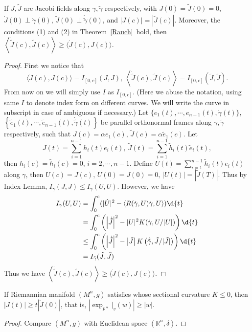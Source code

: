 \begin{lem}\label{compare jacobi fields}
    If $J,\tilde{J}$ are Jacobi fields along $\gamma,\tilde{\gamma}$ respectively, with $J(0)=\tilde{J}(0)=0$, $\dot{J}(0)\perp\dot{\gamma}(0)$, $\dot{\tilde{J}}(0)\perp\dot{\tilde{\gamma}}(0)$, and $|J(c)|=|\tilde{J}(c)|$.
    Moreover, the conditions (1) and (2) in Theorem~\ref{Rauch}~hold, then $\left\langle\dot{\tilde{J}}(c),\tilde{J}(c)\right\rangle\geq\langle\dot{J}(c),J(c)\rangle$.
\end{lem}
\begin{proof}
    First we notice that
    \[\langle\dot{J}(c),J(c)\rangle=I_{[0,c]}(J,J),\ \left\langle\dot{\tilde{J}}(c),\tilde{J}(c)\right\rangle=I_{[0,c]}\left(\tilde{J},\tilde{J}\right).\]
    From now on we will simply use $I$ as $I_{[0,c]}$.
    (Here we abuse the notation, using same $I$ to denote index form on different curves.
    We will write the curve in subscript in case of ambiguous if necessary.)
    Let $\{e_1(t),\cdots,e_{n-1}(t),\dot{\gamma}(t)\}$, $\left\{\tilde{e}_1(t),\cdots,\tilde{e}_{n-1}(t),\dot{\tilde{\gamma}}(t)\right\}$ be parallel orthonormal frames along $\gamma,\tilde{\gamma}$ respectively, such that $J(c)=\alpha e_1(c)$, $\tilde{J}(c)=\alpha\tilde{e}_1(c)$.
    Let
    \[J(t)=\sum_{i=1}^{n-1}h_i(t)e_i(t),\ \tilde{J}(t)=\sum_{i=1}^{n-1}\tilde{h}_i(t)\tilde{e}_i(t),\]
    then $h_i(c)=\tilde{h}_i(c)=0$, $i=2,\cdots,n-1$.
    Define $U(t)=\sum_{i=1}^{n-1}\tilde{h}_i(t)e_i(t)$ along $\gamma$, then $U(c)=J(c)$, $U(0)=J(0)=0$, $|U(t)|=|\tilde{J}(T)|$.
    Thus by Index Lemma, $I_\gamma(J,J)\leq I_\gamma(U,U)$.
    However, we have
    \begin{align*}
        I_\gamma(U,U)&=\int_0^c(|\dot{U}|^2-\langle R(\dot{\gamma},U)\dot{\gamma},U\rangle)\d{t}\\
        &=\int_0^c\left(\left|\dot{\tilde{J}}\right|^2-|U|^2K(\dot{\gamma},U/|U|)\right)\d{t}\\
        &\leq\int_0^c\left(\left|\dot{\tilde{J}}\right|^2-\left|\tilde{J}\right|K\left(\dot{\tilde{\gamma}},\tilde{J}/|\tilde{J}|\right)\right)\d{t}\\
        &=I_{\tilde{\gamma}}(\tilde{J},\tilde{J})
    \end{align*}
    Thus we have $\left\langle\dot{\tilde{J}}(c),\tilde{J}(c)\right\rangle\geq\langle\dot{J}(c),J(c)\rangle$.
\end{proof}

\begin{cor}
    If Riemannian manifold $(M^n,g)$ satisfies whose sectional curvature $K\leq 0$, then $|J(t)|\geq t|\dot{J}(0)|$, that is, $\left|\exp_{p*}|_v(w)\right|\geq|w|$.
\end{cor}
\begin{proof}
    Compare $(M^n,g)$ with Euclidean space $(\mathbb{R}^n,\delta)$.
\end{proof}

